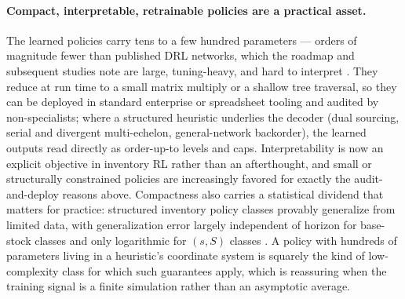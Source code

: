\documentclass[11pt]{article}
\begin{document}
\paragraph{Compact, interpretable, retrainable policies are a practical asset.}
The learned policies carry tens to a few hundred parameters --- orders of magnitude fewer than
published DRL networks, which the roadmap and subsequent studies note are large, tuning-heavy, and
hard to interpret \citep{boute2022deep,gijsbrechts2022drl,kaynov2024owmr}. They reduce at run time to
a small matrix multiply or a shallow tree traversal, so they can be deployed in standard enterprise or
spreadsheet tooling and audited by non-specialists; where a structured heuristic underlies the decoder
(dual sourcing, serial and divergent multi-echelon, general-network backorder), the learned outputs
read directly as order-up-to levels and caps. Interpretability is now an explicit objective in
inventory RL rather than an afterthought, and small or structurally constrained policies are
increasingly favored for exactly the audit-and-deploy reasons above. Compactness also carries a
statistical dividend that matters for practice: structured inventory policy classes provably generalize
from limited data, with generalization error largely independent of horizon for base-stock classes and
only logarithmic for $(s,S)$ classes \citep{xie2024vc}. A policy with hundreds of parameters living in
a heuristic's coordinate system is squarely the kind of low-complexity class for which such guarantees
apply, which is reassuring when the training signal is a finite simulation rather than an asymptotic
average.
\end{document}
